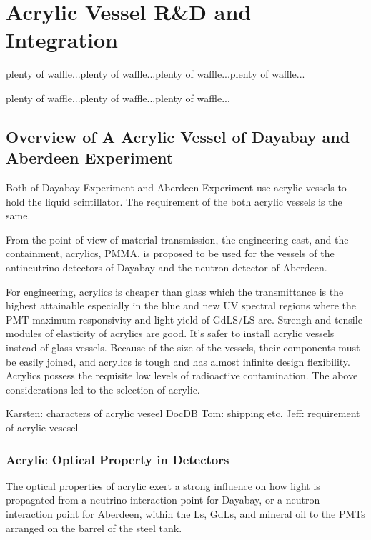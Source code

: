 \chapter {Acrylic Vessel R\&D and Integration}
\label{chap:arylicVessel}

plenty of waffle...plenty of waffle...plenty of waffle...plenty of waffle...

plenty of waffle...plenty of waffle...plenty of waffle...


\section {Overview of A Acrylic Vessel of Dayabay and Aberdeen Experiment}

Both of Dayabay Experiment and Aberdeen Experiment use acrylic vessels to hold
the liquid scintillator. The requirement of the both acrylic vessels is the same.

From the point of view of material transmission, the engineering cast, and the containment, 
acrylics, PMMA, is proposed to be used for the vessels of the antineutrino detectors of Dayabay and the neutron detector of Aberdeen.

For engineering, acrylics is cheaper than glass which the transmittance is the highest attainable
especially in the blue and new UV spectral regions where the PMT maximum responsivity and light yield of GdLS/LS are.
Strengh and tensile modules of elasticity of acrylics are good.
It's safer to install acrylic vessels instead of glass vessels.
Because of the size of the vessels, their components must be easily joined, and acrylics
is tough and has almost infinite design flexibility.
Acrylics possess the requisite low levels of radioactive contamination.
The above considerations led to the selection of acrylic.


Karsten: characters of acrylic veseel DocDB
Tom: shipping etc.
Jeff: requirement of acrylic vesesel


\subsection {Acrylic Optical Property in Detectors}

The optical properties of acrylic exert a strong influence on how light is propagated
from a neutrino interaction point for Dayabay, or a neutron interaction point for Aberdeen,
within the Ls, GdLs, and mineral oil to the PMTs arranged on the barrel of the steel tank.

